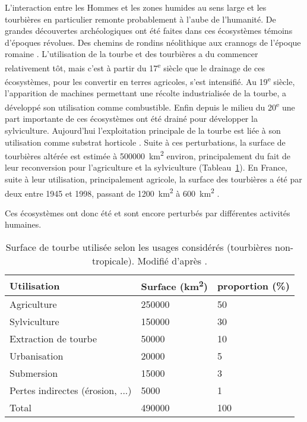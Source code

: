 L'interaction entre les Hommes et les zones humides au sens large et les tourbières en particulier remonte probablement à l'aube de l'humanité.
De grandes découvertes archéologiques ont été faites dans ces écosystèmes témoins d'époques révolues.
Des chemins de rondins néolithique aux crannogs de l'époque romaine \citep{buckland1993}.
L’utilisation de la tourbe et des tourbières a du commencer relativement tôt, mais c'est à partir du 17\textsuperscript{e} siècle que le drainage de ces écosystèmes, pour les convertir en terres agricoles, s'est intensifié.
Au 19\textsuperscript{e} siècle, l'apparition de machines permettant une récolte industrialisée de la tourbe, a développé son utilisation comme combustible.
Enfin depuis le milieu du 20\textsuperscript{e} une part importante de ces écosystèmes ont été drainé pour développer la sylviculture.
Aujourd'hui l'exploitation principale de la tourbe est liée à son utilisation comme substrat horticole \citep{lappalainen1996,chapman2003}.
Suite à ces perturbations, la surface de tourbières altérée est estimée à \SI{500000}{\square\kilo\metre} environ, principalement du fait de leur reconversion pour l'agriculture et la sylviculture (Tableau~\ref{table:tourbeUsage}).
En France, suite à leur utilisation, principalement agricole, la surface des tourbières a été par deux entre 1945 et 1998, passant de \SI{1200}{\square\kilo\meter} à \SI{600}{\square\kilo\meter} \citep{lappalainen1996,manneville1999}.

Ces écosystèmes ont donc été et sont encore perturbés par différentes activités humaines.
\begin{table}[]
\centering
\caption{Surface de tourbe utilisée selon les usages considérés (tourbières non-tropicale). Modifié d'après \citet{joosten2002}.}
\label{table:tourbeUsage}
\begin{tabular}{lll}\toprule
Utilisation & Surface (\si{\square\kilo\meter})  & proportion (\%) \\ \midrule
Agriculture & \num{250000} & \num{50} \\ 
Sylviculture & \num{150000} & \num{30}\\ 
Extraction de tourbe & \num{50000} & \num{10}\\ 
Urbanisation & \num{20000} & \num{5}\\ 
Submersion & \num{15000} & \num{3}\\ 
Pertes indirectes (érosion, ...) & \num{5000} & \num{1}\\[1ex]
Total & \num{490000} & \num{100}\\
\bottomrule
\end{tabular}
\end{table}


